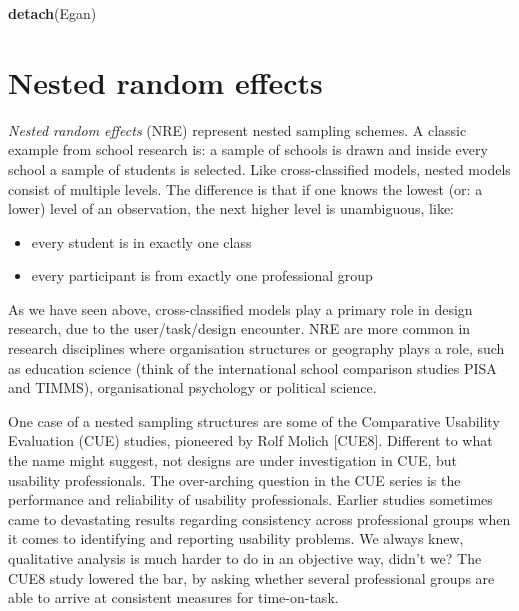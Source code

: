 \documentclass[]{svmono}
\newenvironment{Shaded}{\begin{snugshade}}{\end{snugshade}}
\newcommand{\KeywordTok}[1]{\textcolor[rgb]{0.13,0.29,0.53}{\textbf{#1}}}
\newcommand{\NormalTok}[1]{#1}
\providecommand{\tightlist}{%
  \setlength{\itemsep}{0pt}\setlength{\parskip}{0pt}}
\theoremstyle{definition}
\theoremstyle{definition}
\theoremstyle{definition}
\theoremstyle{remark}
\begin{document}
\begin{Shaded}
\begin{Highlighting}[]
\KeywordTok{detach}\NormalTok{(Egan)}
\end{Highlighting}
\end{Shaded}

\section{Nested random effects}\label{nested-random-effects}

\emph{Nested random effects} (NRE) represent nested sampling schemes. A
classic example from school research is: a sample of schools is drawn
and inside every school a sample of students is selected. Like
cross-classified models, nested models consist of multiple levels. The
difference is that if one knows the lowest (or: a lower) level of an
observation, the next higher level is unambiguous, like:

\begin{itemize}
\tightlist
\item
  every student is in exactly one class
\item
  every participant is from exactly one professional group
\end{itemize}

As we have seen above, cross-classified models play a primary role in
design research, due to the user/task/design encounter. NRE are more
common in research disciplines where organisation structures or
geography plays a role, such as education science (think of the
international school comparison studies PISA and TIMMS), organisational
psychology or political science.

One case of a nested sampling structures are some of the Comparative
Usability Evaluation (CUE) studies, pioneered by Rolf Molich {[}CUE8{]}.
Different to what the name might suggest, not designs are under
investigation in CUE, but usability professionals. The over-arching
question in the CUE series is the performance and reliability of
usability professionals. Earlier studies sometimes came to devastating
results regarding consistency across professional groups when it comes
to identifying and reporting usability problems. We always knew,
qualitative analysis is much harder to do in an objective way, didn't
we? The CUE8 study lowered the bar, by asking whether several
professional groups are able to arrive at consistent measures for
time-on-task.
\end{document}
